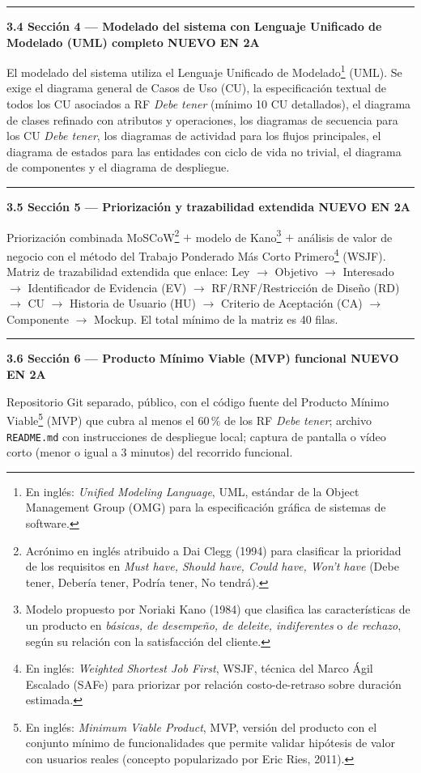 \documentclass[11pt,a4paper]{article}
\newcommand{\submark}[1]{\par\vspace{4pt}\noindent
    {\color{uteqgreen}\rule[-1pt]{3.5pt}{12pt}}\hspace{6pt}\textbf{\color{uteqgreen}#1}\par\vspace{2pt}}
\newcommand{\bA}{{\setlength{\fboxsep}{1.5pt}\colorbox{teal1}{\scriptsize\bfseries\color{white}NUEVO EN 2A}}}
\begin{document}
\submark{3.4 Sección 4 --- Modelado del sistema con Lenguaje Unificado de Modelado (UML) completo \bA}
El modelado del sistema utiliza el Lenguaje Unificado de Modelado\footnote{En inglés: \emph{Unified Modeling Language}, UML, estándar de la Object Management Group (OMG) para la especificación gráfica de sistemas de software.} (UML). Se exige el diagrama general de Casos de Uso (CU), la especificación textual de todos los CU asociados a RF \emph{Debe tener} (mínimo 10 CU detallados), el diagrama de clases refinado con atributos y operaciones, los diagramas de secuencia para los CU \emph{Debe tener}, los diagramas de actividad para los flujos principales, el diagrama de estados para las entidades con ciclo de vida no trivial, el diagrama de componentes y el diagrama de despliegue.

\submark{3.5 Sección 5 --- Priorización y trazabilidad extendida \bA}
Priorización combinada MoSCoW\footnote{Acrónimo en inglés atribuido a Dai Clegg (1994) para clasificar la prioridad de los requisitos en \emph{Must have, Should have, Could have, Won't have} (Debe tener, Debería tener, Podría tener, No tendrá).} $+$ modelo de Kano\footnote{Modelo propuesto por Noriaki Kano (1984) que clasifica las características de un producto en \emph{básicas, de desempeño, de deleite, indiferentes} o \emph{de rechazo}, según su relación con la satisfacción del cliente.} $+$ análisis de valor de negocio con el método del Trabajo Ponderado Más Corto Primero\footnote{En inglés: \emph{Weighted Shortest Job First}, WSJF, técnica del Marco Ágil Escalado (SAFe) para priorizar por relación costo-de-retraso sobre duración estimada.} (WSJF).
Matriz de trazabilidad extendida que enlace: Ley $\rightarrow$ Objetivo $\rightarrow$ Interesado $\rightarrow$ Identificador de Evidencia (EV) $\rightarrow$ RF/RNF/Restricción de Diseño (RD) $\rightarrow$ CU $\rightarrow$ Historia de Usuario (HU) $\rightarrow$ Criterio de Aceptación (CA) $\rightarrow$ Componente $\rightarrow$ Mockup.
El total mínimo de la matriz es 40 filas.

\submark{3.6 Sección 6 --- Producto Mínimo Viable (MVP) funcional \bA}
Repositorio Git separado, público, con el código fuente del Producto Mínimo Viable\footnote{En inglés: \emph{Minimum Viable Product}, MVP, versión del producto con el conjunto mínimo de funcionalidades que permite validar hipótesis de valor con usuarios reales (concepto popularizado por Eric Ries, 2011).} (MVP) que cubra al menos el 60\,\% de los RF \emph{Debe tener}; archivo \texttt{README.md} con instrucciones de despliegue local; captura de pantalla o vídeo corto (menor o igual a 3 minutos) del recorrido funcional.
\end{document}
